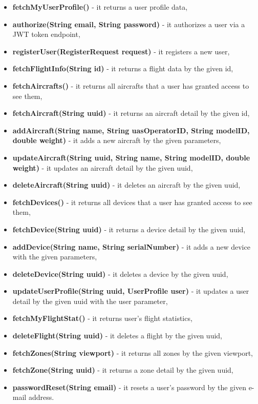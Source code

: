 \begin{itemize}
    \item \textbf{fetchMyUserProfile()} - it returns a user profile data,
    \item \textbf{authorize(String email, String password)} - it authorizes a user via a JWT token endpoint,
    \item \textbf{registerUser(RegisterRequest request)} - it registers a new user,
    \item \textbf{fetchFlightInfo(String id)} - it returns a flight data by the given id,
    \item \textbf{fetchAircrafts()} - it returns all aircrafts that a user has granted access to see them,
    \item \textbf{fetchAircraft(String uuid)} - it returns an aircraft detail by the given id,
    \item \textbf{addAircraft(String name, String uasOperatorID, String modelID, double weight)} - it adds a new aircraft by the given parameters,
    \item \textbf{updateAircraft(String uuid, String name, String modelID, double weight)} - it updates an aircraft detail by the given uuid,
    \item \textbf{deleteAircraft(String uuid)} - it deletes an aircraft by the given uuid,
    \item \textbf{fetchDevices()} - it returns all devices that a user has granted access to see them,
    \item \textbf{fetchDevice(String uuid)} - it returns a device detail by the given uuid,
    \item \textbf{addDevice(String name, String serialNumber)} - it adds a new device with the given parameters,
    \item \textbf{deleteDevice(String uuid)} - it deletes a device by the given uuid,
    \item \textbf{updateUserProfile(String uuid, UserProfile user)} - it updates a user detail by the given uuid with the user parameter,
    \item \textbf{fetchMyFlightStat()} - it returns user's flight statistics,
    \item \textbf{deleteFlight(String uuid)} - it deletes a flight by the given uuid,
    \item \textbf{fetchZones(String viewport)} - it returns all zones by the given viewport,
    \item \textbf{fetchZone(String uuid)} - it returns a zone detail by the given uuid,
    \item \textbf{passwordReset(String email)} - it resets a user's password by the given e-mail address.
\end{itemize}

